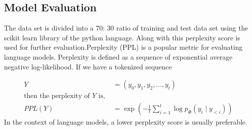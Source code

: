 \subsection{Model Evaluation}

The data set is divided into a 70: 30 ratio of training and test data set using the scikit learn library of the python language. Along with this perplexity score is used for further evaluation.Perplexity (PPL) is a popular metric for evaluating language models. Perplexity is defined as a sequence of exponential average negative log-likelihood. If we have a tokenized sequence

\begin{align*}
    Y &= (y_0, y_1, y_2, \ldots, y_t) \\
    \text{then the perplexity of } Y \text{ is, } \\
    PPL(Y) &= \exp\left(-\frac{1}{t} \sum_{i=1}^{t} \log p_{\Phi}(y_i \mid y_{<i})\right)
\end{align*}
In the context of language models, a lower perplexity score is usually preferable.